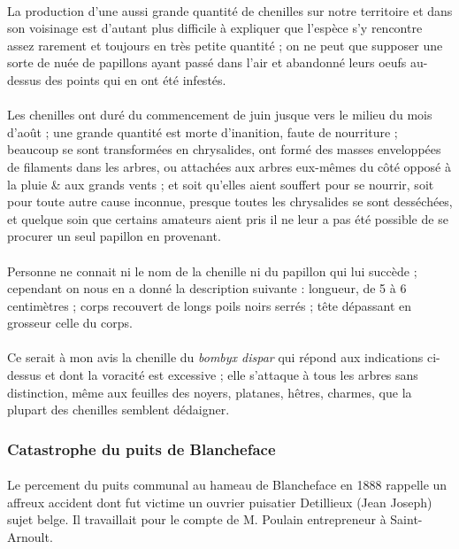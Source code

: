 \documentclass[../eBook.tex]{subfiles}
\begin{document}
      \paragraph{}La production d'une aussi grande quantité de chenilles sur notre territoire et dans son voisinage est d'autant plus difficile à expliquer que l'espèce s'y rencontre assez rarement et toujours en très petite quantité ; on ne peut que supposer une sorte de nuée de papillons ayant passé dans l'air et abandonné leurs oeufs au-dessus des points qui en ont été infestés.
      \paragraph{}Les chenilles ont duré du commencement de juin jusque vers le milieu du mois d'août ; une grande quantité est morte d'inanition, faute de nourriture ; beaucoup se sont transformées en chrysalides, ont formé des masses enveloppées de filaments dans les arbres, ou attachées aux arbres eux-mêmes du côté opposé à la pluie \& aux grands vents ; et soit qu'elles aient souffert pour se nourrir, soit pour toute autre cause inconnue, presque toutes les chrysalides se sont desséchées, et quelque soin que certains amateurs aient pris il ne leur a pas été possible de se procurer un seul papillon en provenant.
      \paragraph{}Personne ne connait ni le nom de la chenille ni du papillon qui lui succède ; cependant on nous en a donné la description suivante : longueur, de 5 à 6 centimètres ; corps recouvert de longs poils noirs serrés ; tête dépassant en grosseur celle du corps.
      \paragraph{}Ce serait à mon avis la chenille du \textit{bombyx dispar} qui répond aux indications ci-dessus et dont la voracité est excessive ; elle s'attaque à tous les arbres sans distinction, même aux feuilles des noyers, platanes, hêtres, charmes, que la plupart des chenilles semblent dédaigner.

    \subsubsection*{Catastrophe du puits de Blancheface}
      \paragraph{}Le percement du puits communal au hameau de Blancheface en 1888 rappelle un affreux accident dont fut victime un ouvrier puisatier Detillieux (Jean Joseph) sujet belge. Il travaillait pour le compte de M. Poulain entrepreneur à Saint-Arnoult.
\end{document}
